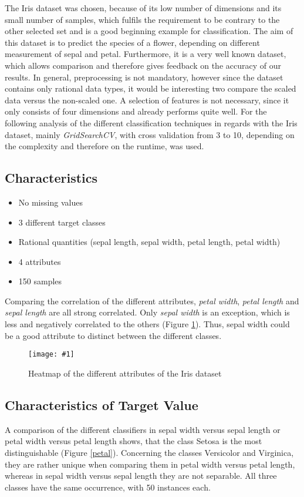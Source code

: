 \documentclass{article}
\newcommand{\size}{0.8\textwidth}
\newcommand{\image}[3]{
\begin{figure}
\begin{center}
\texttt{[image: \#1]}
\caption{#2}
#3
\end{center}
\end{figure}
}
\begin{document}
The Iris dataset was chosen, because of its low number of dimensions and its small number of samples, which fulfils the requirement to be contrary to the other selected set and is a good beginning example for classification. The aim of this dataset is to predict the species of a flower, depending on different measurement of sepal and petal. Furthermore, it is a very well known dataset, which allows comparison and therefore gives feedback on the accuracy of our results. In general, preprocessing is not mandatory, however since the dataset contains only rational data types, it would be interesting two compare the scaled data versus the non-scaled one. A selection of features is not necessary, since it only consists of four dimensions and already performs quite well. For the following analysis of the different classification techniques in regards with the Iris dataset, mainly \textit{GridSearchCV}, with cross validation from 3 to 10, depending on the complexity and therefore on the runtime, was used. 

\subsection{Characteristics}

\begin{itemize}
\item No missing values
\item 3 different target classes
\item Rational quantities (sepal length, sepal width, petal length, petal width)
\item 4 attributes
\item 150 samples
\end{itemize}

Comparing the correlation of the different attributes, \textit{petal width}, \textit{petal length} and \textit{sepal length} are all strong correlated. Only \textit{sepal width} is an exception, which is less and negatively correlated to the others (Figure \ref{fig:heat}). Thus, sepal width could be a good attribute to distinct between the different classes.

\image{plots/heatmap.png}{Heatmap of the different attributes of the Iris dataset}{\label{fig:heat}}

\subsection{Characteristics of Target Value}
A comparison of the different classifiers in sepal width versus sepal length or petal width versus petal length shows, that the class Setosa is the most distinguishable (Figure \ref{petal}). Concerning the classes Versicolor and Virginica, they are rather unique when comparing them in petal width versus petal length, whereas in sepal width versus sepal length they are not separable. All three classes have the same occurrence, with 50 instances each.
\end{document}
